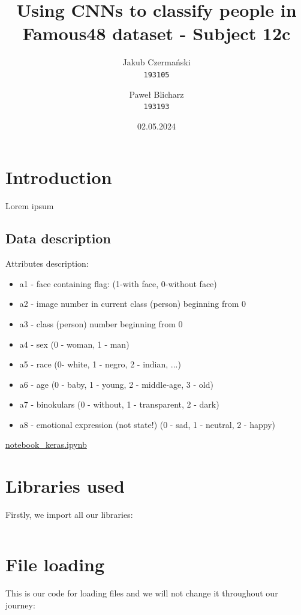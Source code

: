 \documentclass[12pt]{article}
\author{
  Jakub Czermański\\
  \texttt{193105}
  \and
  Paweł Blicharz\\
  \texttt{193193}
}
\date{02.05.2024}
\title{Using CNNs to classify people in Famous48 dataset - Subject 12c}
\begin{document}
  \maketitle
  \newpage
  \tableofcontents
  \newpage

  \section{Introduction}
    Lorem ipsum
    \subsection*{Data description}
      Attributes description:
      \begin{itemize}
        \item a1 - face containing flag: (1-with face, 0-without face)
        \item a2 - image number in current class (person) beginning from 0
        \item a3 - class (person) number beginning from 0
        \item a4 - sex (0 - woman, 1 - man)
        \item a5 - race (0- white, 1 - negro, 2 - indian, ...)
        \item a6 - age (0 - baby, 1 - young, 2 - middle-age, 3 - old)
        \item a7 - binokulars (0 - without, 1 - transparent, 2 - dark)
        \item a8 - emotional expression (not state!) (0 - sad, 1 - neutral, 2 - happy)
      \end{itemize}
    \hyperlink{../notebook_keras.ipynb}{notebook\_keras.ipynb}
  \section{Libraries used}
    Firstly, we import all our libraries:
    \inputminted[linenos]{python}{code/imports.py}
  \section{File loading}
    This is our code for loading files and we will not change it throughout our journey:
    \inputminted[linenos]{python}{code/loading.py}
\end{document}
